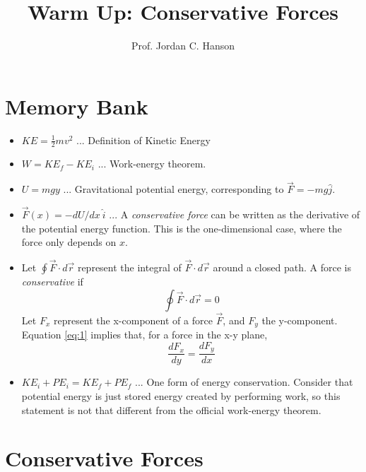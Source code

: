 \documentclass{article}
\begin{document}
\twocolumn
\title{Warm Up: Conservative Forces}
\author{Prof. Jordan C. Hanson}

\maketitle

\section{Memory Bank}

\begin{itemize}
\item $KE = \frac{1}{2}m v^2$ ... Definition of Kinetic Energy
\item $W = KE_f - KE_i$ ... Work-energy theorem.
\item $U = mgy$ ... Gravitational potential energy, corresponding to $\vec{F} = -mg \hat{j}$.
\item $\vec{F}(x) = -dU/dx ~ \hat{i}$ ... A \textit{conservative force} can be written as the derivative of the potential energy function.  This is the one-dimensional case, where the force only depends on $x$.
\item Let $\oint \vec{F}\cdot d\vec{r}$ represent the integral of $\vec{F}\cdot d\vec{r}$ around a closed path.  A force is \textit{conservative} if
\begin{equation}
\oint \vec{F} \cdot d\vec{r} = 0 \label{eq:1}
\end{equation}
Let $F_x$ represent the x-component of a force $\vec{F}$, and $F_y$ the y-component.  Equation \ref{eq:1} implies that, for a force in the x-y plane,
\begin{equation}
\frac{dF_x}{dy} = \frac{dF_y}{dx}
\end{equation}
\item $KE_i + PE_i = KE_f + PE_f$ ... One form of energy conservation.  Consider that potential energy is just stored energy created by performing work, so this statement is not that different from the official work-energy theorem.
\end{itemize}

\section{Conservative Forces}
\end{document}
